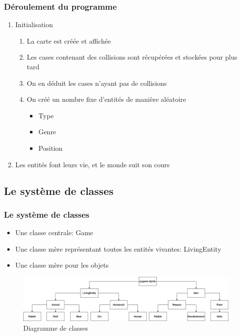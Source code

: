 \documentclass{beamer}
\begin{document}
\begin{frame} \frametitle{Déroulement du programme}
	\begin{enumerate}
		\item Initialisation
			\begin{enumerate}
				\item La carte est créée et affichée
				\item Les cases contenant des collisions sont récupérées et stockées pour plus tard
				\item On en déduit les cases n'ayant pas de collisions
				\item On créé un nombre fixe d'entités de manière aléatoire
					\begin{itemize}
						\item Type
						\item Genre
						\item Position
					\end{itemize}
			\end{enumerate}
		\item Les entités font leurs vie, et le monde suit son cours
	\end{enumerate}
\end{frame}

\subsection{Le système de classes}

\begin{frame} \frametitle{Le système de classes}
	\begin{itemize}
		\item Une classe centrale: Game
		\item Une classe mère représentant toutes les entités vivantes: LivingEntity
		\item Une classe mère pour les objets
	\end{itemize}
	\begin{figure}
		\includegraphics[scale=0.24]{diagramme_class.png}
		\caption{Diagramme de classes}
		\label{Diagramme de classes}
	\end{figure}
\end{frame}
\end{document}
